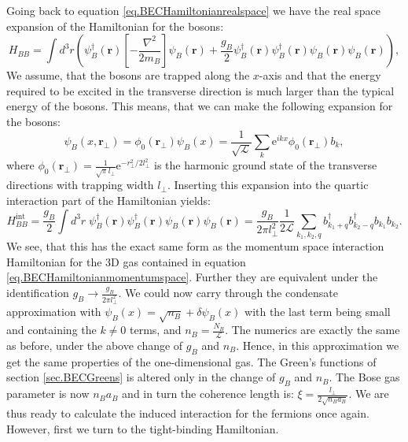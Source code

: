 Going back to equation \eqref{eq.BECHamiltonianrealspace} we have the real space expansion of the Hamiltonian for the bosons:
\begin{equation}
H_{BB} = \int d^3 r \left(\psi_B^\dagger(\mathbf{r})\left[-\frac{\nabla^2}{2m_B}\right]\psi_B(\mathbf{r}) + \frac{g_B}{2}\psi_B^\dagger(\mathbf{r})\psi_B^\dagger(\mathbf{r})\psi_B(\mathbf{r})\psi_B(\mathbf{r})  \right), \nonumber
\end{equation}
We assume, that the bosons are trapped along the $x$-axis and that the energy required to be excited in the transverse direction is much larger than the typical energy of the bosons. This means, that we can make the following expansion for the bosons:
\begin{equation}
\psi_B(x, \mathbf{r}_{\perp}) = \phi_0(\mathbf{r}_{\perp}) \psi_B(x) = \frac{1}{\sqrt{\mathcal{L}}} \sum_k \text{e}^{ikx} \phi_0(\mathbf{r}_{\perp}) b_k, 
\nonumber
\end{equation}
where $\phi_0(\mathbf{r}_\perp) = \frac{1}{\sqrt{\pi}l_{\perp}}\text{e}^{-r_{\perp}^2/2l_{\perp}^2}$ is the harmonic ground state of the transverse directions with trapping width $l_{\perp}$. Inserting this expansion into the quartic interaction part of the Hamiltonian yields:
\begin{equation}
H_{BB}^{\text{int}} = \frac{g_B}{2}\int d^3 r \; \psi_B^\dagger(\mathbf{r})\psi_B^\dagger(\mathbf{r})\psi_B(\mathbf{r})\psi_B(\mathbf{r}) = \frac{g_B}{2\pi l_{\perp}^2}\frac{1}{2\mathcal{L}}\sum_{k_1,k_2,q} b^\dagger_{k_1 + q}b^\dagger_{k_2 - q}b_{k_1}b_{k_2}. \nonumber
\end{equation}
We see, that this has the exact same form as the momentum space interaction Hamiltonian for the 3D gas contained in equation \eqref{eq.BECHamiltonianmomentumspace}. Further they are equivalent under the identification $g_B \to \frac{g_B}{2\pi l_{\perp}^2}$. We could now carry through the condensate approximation with $\psi_B(x) = \sqrt{n_B} + \delta\psi_B(x)$ with the last term being small and containing the $k \neq 0$ terms, and $n_B = \frac{N_B}{\mathcal{L}}$. The numerics are exactly the same as before, under the above change of $g_B$ and $n_B$. Hence, in this approximation we get the same properties of the one-dimensional gas. The Green's functions of section \ref{sec.BECGreens} is altered only in the change of $g_B$ and $n_B$. The Bose gas parameter is now $n_Ba_B$ and in turn the coherence length is: $\xi = \frac{l_{\perp}}{2\sqrt{n_Ba_B}}$. We are thus ready to calculate the induced interaction for the fermions once again. However, first we turn to the tight-binding Hamiltonian.  

